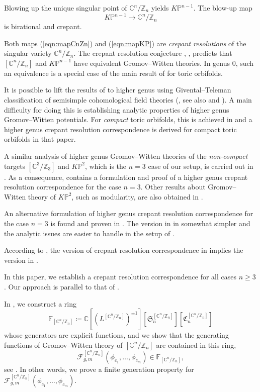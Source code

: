 \documentclass[12pt]{amsart}
\numberwithin{equation}{section}
\newcommand{\CnZn}{[\mathbb{C}^n/\mathbb{Z}_n]}
\newcommand{\KP}{K\mathbb{P}}
\begin{document}
Blowing up the unique singular point of $\mathbb{C}^n/\mathbb{Z}_n$ yields $\KP^{n-1}$. The blow-up map
\begin{equation}\label{eqn:mapKP}
\KP^{n-1}\to \mathbb{C}^n/\mathbb{Z}_n    
\end{equation}
is birational and crepant. 

Both maps (\ref{eqn:mapCnZn}) and (\ref{eqn:mapKP}) are {\em crepant resolutions} of the singular variety $\mathbb{C}^n/\mathbb{Z}_n$. The crepant resolution conjecture \cite{bg}, \cite{cit}, \cite{cr} predicts that $\CnZn$ and $\KP^{n-1}$ have equivalent Gromov--Witten theories. In genus $0$, such an equivalence is a special case of the main result of \cite{cij} for toric orbifolds.

It is possible to lift the results of \cite{cij} to higher genus using Givental--Teleman classification of semisimple cohomological field theories (\cite{t}, see also \cite{ppz} and \cite{Picm}). A main difficulty for doing this is establishing analytic properties of higher genus Gromov--Witten potentials. For {\em compact} toric orbifolds, this is achieved in \cite{ci0} and a higher genus crepant resolution correspondence is derived for compact toric orbifolds in that paper. 

A similar analysis of higher genus Gromov--Witten theories of the {\em non-compact} targets $[\mathbb{C}^3/\mathbb{Z}_3]$ and $K\mathbb{P}^2$, which is the $n=3$ case of our setup, is carried out in \cite{ci}. As a consequence, \cite{ci} contains a formulation and proof of a higher genus crepant resolution correspondence for the case $n=3$. Other results about Gromov--Witten theory of $K\mathbb{P}^2$, such as modularity, are also obtained in \cite{ci}.

An alternative formulation of higher genus crepant resolution correspondence for the case $n=3$ is found and proven in \cite{lho-p}. The version in \cite{lho-p} in somewhat simpler and the analytic issues are easier to handle in the setup of \cite{lho-p}.

According to \cite[Section 10.7]{ci}, the version of crepant resolution correspondence in \cite{ci} implies the version in \cite{lho-p}.

In this paper, we establish a crepant resolution correspondence for all cases $n\geq 3$. Our approach is parallel to that of \cite{lho-p}. 

In \cite{gt}, we construct a ring $$\mathds{F}_{\CnZn}\coloneqq \mathbb{C}[(L^{\CnZn})^{\pm{1}}][\mathfrak{S}^{\CnZn}_n][\mathfrak{C}^{\CnZn}_n]$$ whose generators are explicit functions, and we show that the generating functions of Gromov--Witten theory of $\CnZn$ are contained in this ring,
\begin{equation*}
\mathcal{F}_{g, m}^{\left[\mathbb{C}^{n} / \mathbb{Z}_{n}\right]}\left(\phi_{c_{1}}, \ldots, \phi_{c_{m}}\right)\in\mathds{F}_{\CnZn},
\end{equation*}
see \cite[Corollary 3.4]{gt}. In other words, we prove a finite generation property for $\mathcal{F}_{g, m}^{\left[\mathbb{C}^{n} / \mathbb{Z}_{n}\right]}\left(\phi_{c_{1}}, \ldots, \phi_{c_{m}}\right)$.
\end{document}
